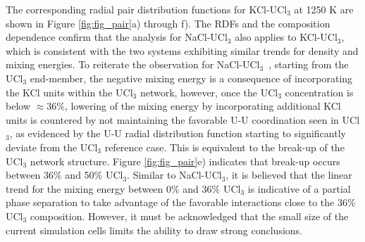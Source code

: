 \documentclass[preprint,3p,10pt,twocolumn,number,sort&compress]{elsarticle}
\begin{document}
The corresponding radial pair distribution functions for KCl-UCl$_3$ at 1250 K are shown in Figure \ref{fig:fig_pair}a) through f). The RDFs and the composition dependence confirm that the analysis for NaCl-UCl$_3$ also applies to KCl-UCl$_3$, which is consistent with the two systems exhibiting similar trends for density and mixing energies. To reiterate the observation for NaCl-UCl$_3$~\cite{Andersson}, starting from the UCl$_3$ end-member, the negative mixing energy is a consequence of incorporating the KCl units within the UCl$_3$ network, however, once the UCl$_3$ concentration is below $\approx36\%$, lowering of the mixing energy by incorporating additional KCl units is countered by not maintaining the favorable U-U coordination seen in UCl$_3$, as evidenced by the U-U radial distribution function starting to significantly deviate from the UCl$_3$ reference case. This is equivalent to the break-up of the UCl$_3$ network structure. Figure \ref{fig:fig_pair}e) indicates that break-up occurs between 36\% and 50\% UCl$_3$. Similar to NaCl-UCl$_3$, it is believed that the linear trend for the mixing energy between 0\% and 36\% UCl$_3$ is indicative of a partial phase separation to take advantage of the favorable interactions close to the 36\% UCl$_3$ composition. However, it must be acknowledged that the small size of the current simulation cells limits the ability to draw strong conclusions. 
\end{document}
